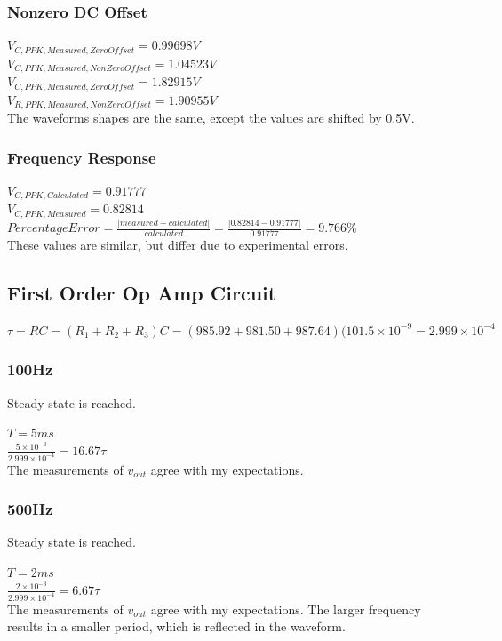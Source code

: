 \documentclass[10pt]{article}
\begin{document}
\subsubsection*{Nonzero DC Offset}
$V_{C,PPK,Measured,ZeroOffset} = 0.99698V$\\
$V_{C,PPK,Measured,NonZeroOffset} = 1.04523V$\\
$V_{C,PPK,Measured,ZeroOffset} = 1.82915V$\\
$V_{R,PPK,Measured,NonZeroOffset} = 1.90955V$\\
\noindent The waveforms shapes are the same, except the values are shifted by 0.5V.

\subsubsection*{Frequency Response}
$V_{C,PPK,Calculated} = 0.91777$\\
$V_{C,PPK,Measured} = 0.82814$\\
$Percentage Error = \frac{|measured-calculated|}{calculated} = \frac{|0.82814-0.91777|}{0.91777} = 9.766\%$\\
\noindent These values are similar, but differ due to experimental errors.

\subsection*{First Order Op Amp Circuit}
$\tau = RC = (R_1+R_2+R_3)C = (985.92+981.50+987.64)(101.5\times10^{-9} = 2.999\times10^{-4}$
\subsubsection*{100Hz}
\noindent Steady state is reached. 

$T = 5ms$\\
$\frac{5\times10^{-3}}{2.999\times10^{-4}} = 16.67\tau$\\
\noindent The measurements of $v_{out}$ agree with my expectations.

\subsubsection*{500Hz}
\noindent Steady state is reached.

$T = 2ms$\\
$\frac{2\times10^{-3}}{2.999\times10^{-4}} = 6.67\tau$\\
\noindent The measurements of $v_{out}$ agree with my expectations. The larger frequency results in a smaller period, which is reflected in the waveform.
\end{document}
